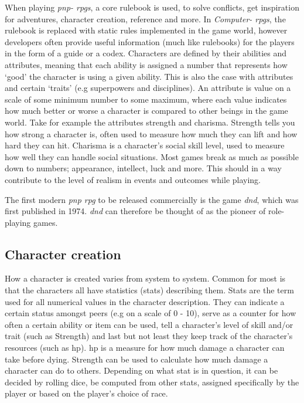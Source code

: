 When playing \emph{\ac{pnp}- \ac{rpgs}}, a core rulebook is used, to solve conflicts, get inspiration for adventures, character creation, reference and more. In \emph{Computer- \ac{rpgs}}, the rulebook is replaced with static rules implemented in the game world, however developers often provide useful information (much like rulebooks) for the players in the form of a guide or a codex.
Characters are defined by their abilities and attributes, meaning that each ability is assigned a number that represents how `good' the character is using a given ability. This is also the case with attributes and certain `traits' (e.g superpowers and disciplines). An attribute is value on a scale of some minimum number to some maximum, where each value indicates how much better or worse a character is compared to other beings in the game world. Take for example the attributes strength and charisma. Strength tells you how strong a character is, often used to measure how much they can lift and how hard they can hit. Charisma is a character's social skill level, used to measure how well they can handle social situations. Most games break as much as possible down to numbers; appearance, intellect, luck and more.
This should in a way contribute to the level of realism in events and outcomes while playing.

The first modern \emph{\ac{pnp} \ac{rpg}} to be released commercially is the game \emph{\ac{dnd}}, which was first published in 1974.\cite{wikidnd}
\emph{\ac{dnd}} can therefore be thought of as the pioneer of role-playing games.

\subsection{Character creation}

How a character is created varies from system to system. Common for most is that the characters all have statistics (stats) describing them.
Stats are the term used for all numerical values in the character description. They can indicate a certain status amongst peers (e.g on a scale of 0 - 10), serve as a counter for how often a certain ability or item can be used, tell a character's level of skill and/or trait (such as Strength) and last but not least they keep track of the character's resources (such as \ac{hp}).
\ac{hp} is a measure for how much damage a character can take before dying. Strength can be used to calculate how much damage a character can do to others. Depending on what stat is in question, it can be decided by rolling dice, be computed from other stats, assigned specifically by the player or based on the player's choice of race.

